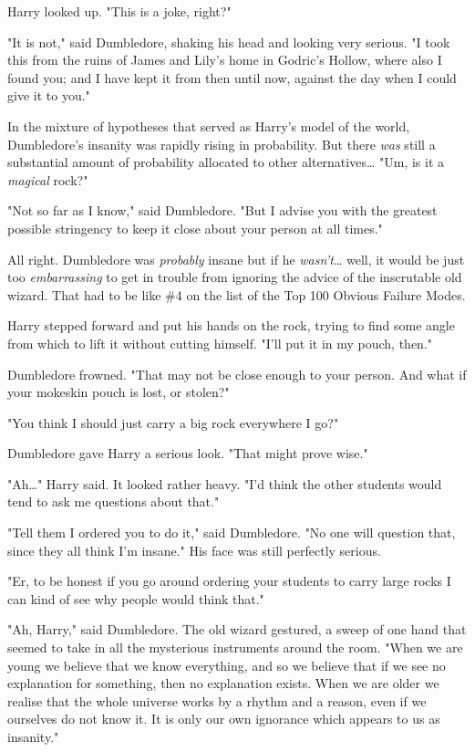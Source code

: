 Harry looked up. "This is a joke, right?"

"It is not," said Dumbledore, shaking his head and looking very serious. "I 
took this from the ruins of James and Lily's home in Godric's Hollow, where 
also I found you; and I have kept it from then until now, against the day when 
I could give it to you."

In the mixture of hypotheses that served as Harry's model of the world, 
Dumbledore's insanity was rapidly rising in probability. But there \emph{was} 
still a substantial amount of probability allocated to other 
alternatives{\ldots} "Um, is it a \emph{magical} rock?"

"Not so far as I know," said Dumbledore. "But I advise you with the greatest 
possible stringency to keep it close about your person at all times."

All right. Dumbledore was \emph{probably} insane but if he 
\emph{wasn't}{\ldots} well, it would be just too \emph{embarrassing} to get in 
trouble from ignoring the advice of the inscrutable old wizard. That had to be 
like \#4 on the list of the Top 100 Obvious Failure Modes.

Harry stepped forward and put his hands on the rock, trying to find some angle 
from which to lift it without cutting himself. "I'll put it in my pouch, then."

Dumbledore frowned. "That may not be close enough to your person. And what if 
your mokeskin pouch is lost, or stolen?"

"You think I should just carry a big rock everywhere I go?"

Dumbledore gave Harry a serious look. "That might prove wise."

"Ah{\ldots}" Harry said. It looked rather heavy. "I'd think the other students 
would tend to ask me questions about that."

"Tell them I ordered you to do it," said Dumbledore. "No one will question 
that, since they all think I'm insane." His face was still perfectly serious.

"Er, to be honest if you go around ordering your students to carry large rocks 
I can kind of see why people would think that."

"Ah, Harry," said Dumbledore. The old wizard gestured, a sweep of one hand that 
seemed to take in all the mysterious instruments around the room. "When we are 
young we believe that we know everything, and so we believe that if we see no 
explanation for something, then no explanation exists. When we are older we 
realise that the whole universe works by a rhythm and a reason, even if we 
ourselves do not know it. It is only our own ignorance which appears to us as 
insanity."

